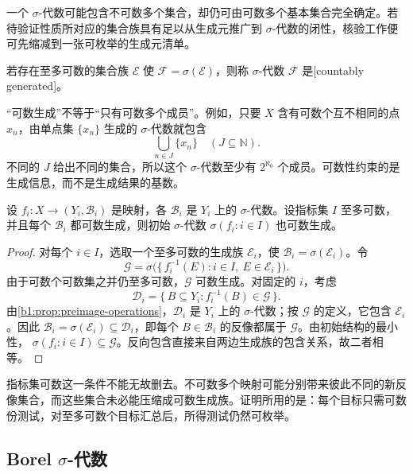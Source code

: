 一个 \(\sigma\)-代数可能包含不可数多个集合，却仍可由可数多个基本集合完全确定。若待验证性质所对应的集合族具有足以从生成元推广到 \(\sigma\)-代数的闭性，核验工作便可先缩减到一张可枚举的生成元清单。

\begin{definition}
\label{b1:def:countably-generated}
若存在至多可数的集合族 \(\mathcal E\) 使 \(\mathcal F=\sigma(\mathcal E)\)，则称 \(\sigma\)-代数 \(\mathcal F\) 是[countably generated]。
\end{definition}

“可数生成”不等于“只有可数多个成员”。例如，只要 \(X\) 含有可数个互不相同的点 \(x_n\)，由单点集 \(\{x_n\}\) 生成的 \(\sigma\)-代数就包含
\[
\bigcup_{n\in J}\{x_n\}
\quad(J\subseteq\mathbb N).
\]
不同的 \(J\) 给出不同的集合，所以这个 \(\sigma\)-代数至少有 \(2^{\aleph_0}\) 个成员。可数性约束的是生成信息，而不是生成结果的基数。

\begin{proposition}
\label{b1:prop:initial-countably-generated}
设 \(f_i:X\to(Y_i,\mathcal B_i)\) 是映射，各 \(\mathcal B_i\) 是 \(Y_i\) 上的 \(\sigma\)-代数。设指标集 \(I\) 至多可数，并且每个 \(\mathcal B_i\) 都可数生成，则初始 \(\sigma\)-代数 \(\sigma(f_i:i\in I)\) 也可数生成。
\end{proposition}
\begin{proof}
对每个 \(i\in I\)，选取一个至多可数的生成族 \(\mathcal E_i\)，使 \(\mathcal B_i=\sigma(\mathcal E_i)\)。令
\[
\mathcal G
=\sigma\bigl(\{\,f_i^{-1}(E):i\in I,\ E\in\mathcal E_i\,\}\bigr).
\]
由于可数个可数集之并仍至多可数，\(\mathcal G\) 可数生成。对固定的 \(i\)，考虑
\[
\mathcal D_i
=\{\,B\subseteq Y_i:f_i^{-1}(B)\in\mathcal G\,\}.
\]
由\cref{b1:prop:preimage-operations}，\(\mathcal D_i\) 是 \(Y_i\) 上的 \(\sigma\)-代数；按 \(\mathcal G\) 的定义，它包含 \(\mathcal E_i\)。因此
\(
\mathcal B_i=\sigma(\mathcal E_i)\subseteq\mathcal D_i
\)，即每个 \(B\in\mathcal B_i\) 的反像都属于 \(\mathcal G\)。由初始结构的最小性，
\(
\sigma(f_i:i\in I)\subseteq\mathcal G
\)。反向包含直接来自两边生成族的包含关系，故二者相等。
\end{proof}

指标集可数这一条件不能无故删去。不可数多个映射可能分别带来彼此不同的新反像集合，而这些集合未必能压缩成可数生成族。证明所用的是：每个目标只需可数份测试，对至多可数个目标汇总后，所得测试仍然可枚举。

\subsection{Borel \texorpdfstring{\(\sigma\)}{\AnalysisPdfSigma}-代数}
\label{b1:subsec:010204}

